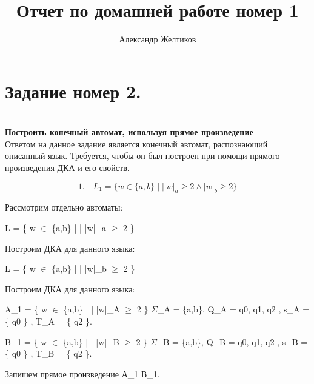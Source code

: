\documentclass[fleqn]{article}
\title{Отчет по домашней работе номер 1}
\author{Александр Желтиков}
\begin{document}
\chapter{\textbf{\large{Задание номер 2.}}} \\
\textbf{Построить конечный автомат, используя прямое произведение}
\\

Ответом на данное задание является конечный автомат, распознающий описанный язык. Требуется, чтобы он был построен при помощи прямого произведения ДКА и его свойств.

\begin{equation}
1. \quad L_1 = \{ w \in \{a,b\} \; | \; | |w|_a \geq 2 \wedge |w|_b \geq 2 \}    \nonumber
\end{equation}

Рассмотрим отдельно автоматы: 

L = \{ w $\in$ \{a,b\} \; | \; | |w|_a $\geq$ 2 \}

Построим ДКА для данного языка:

    
L = \{ w $\in$ \{a,b\} \; | \; | |w|_b $\geq$ 2 \}

Построим ДКА для данного языка:

 
 A_1 =  \{ w $\in$ \{a,b\} \; | \; | |w|_A $\geq$ 2 \} $\Sigma$_A = \{a,b\}, Q_A = {q0, q1, q2} , s_A = \{ q0 \} , T_A = \{ q2 \}.
 
 B_1 =  \{ w $\in$ \{a,b\} \; | \; | |w|_B $\geq$ 2 \} $\Sigma$_B = \{a,b\}, Q_B = {q0, q1, q2} , s_B = \{ q0 \} , T_B = \{ q2 \}.
 
 Запишем прямое произведение А_1 В_1.
 
\end{document}
